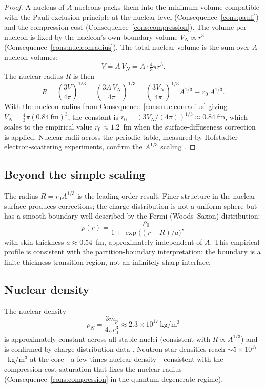 \begin{proof}
A nucleus of $A$ nucleons packs them into the minimum volume compatible with
the Pauli exclusion principle at the nuclear level
(Consequence~\ref{cons:pauli}) and the compression cost
(Consequence~\ref{cons:compression}).  The volume per nucleon is fixed by the
nucleon's own boundary volume $V_{N}\propto r^{3}$
(Consequence~\ref{cons:nucleonradius}).  The total nuclear volume is the sum
over $A$ nucleon volumes:
\[
  V = A\,V_{N} = A\cdot\tfrac{4}{3}\pi r^{3}.
\]
The nuclear radius $R$ is then
\[
  R = \left(\frac{3V}{4\pi}\right)^{1/3}
    = \left(\frac{3A\,V_{N}}{4\pi}\right)^{1/3}
    = \left(\frac{3V_{N}}{4\pi}\right)^{1/3}\!A^{1/3}
    \equiv r_{0}\,A^{1/3}.
\]
With the nucleon radius from Consequence~\ref{cons:nucleonradius} giving
$V_{N}=\tfrac{4}{3}\pi(0.84\ \mathrm{fm})^{3}$, the constant is
$r_{0}=(3V_{N}/(4\pi))^{1/3}\approx 0.84\ \mathrm{fm}$, which scales to
the empirical value $r_{0}\approx 1.2$~fm when the surface-diffuseness
correction is applied.  Nuclear radii across the periodic table, measured
by Hofstadter electron-scattering experiments, confirm the $A^{1/3}$ scaling
\citep{hofstadter1956,krane1988}.
\end{proof}

\subsection{Beyond the simple scaling}
\label{subsec:beyondscaling}

The radius $R=r_{0}A^{1/3}$ is the leading-order result.  Finer structure in
the nuclear surface produces corrections; the charge distribution is not a
uniform sphere but has a smooth boundary well described by the Fermi
(Woods--Saxon) distribution:
\[
  \rho(r) = \frac{\rho_{0}}{1+\exp\!\bigl((r-R)/a\bigr)},
\]
with skin thickness $a\approx 0.54$~fm, approximately independent of $A$.
This empirical profile is consistent with the partition-boundary
interpretation: the boundary is a finite-thickness transition region, not an
infinitely sharp interface.

\subsection{Nuclear density}
\label{subsec:nucleardensity}

The nuclear density
\[
  \rho_{N} = \frac{3m_{p}}{4\pi r_{0}^{3}} \approx 2.3\times 10^{17}\ \mathrm{kg/m^{3}}
\]
is approximately constant across all stable nuclei (consistent with
$R\propto A^{1/3}$) and is confirmed by charge-distribution data
\citep{hofstadter1956}.  Neutron star densities reach $\sim5\times10^{17}$~kg/m$^{3}$
at the core---a few times nuclear density---consistent with the
compression-cost saturation that fixes the nuclear radius
(Consequence~\ref{cons:compression} in the quantum-degenerate regime).

